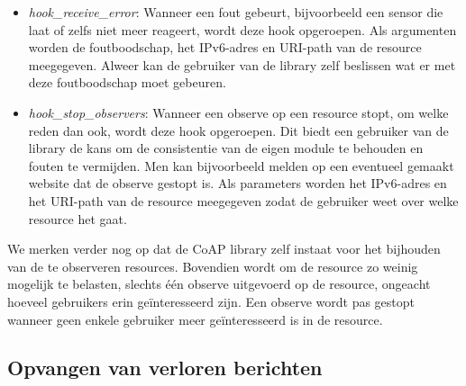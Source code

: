\begin{itemize}
\begin{itemize}
\item \textit{hook\_receive\_error}: Wanneer een fout gebeurt, bijvoorbeeld een sensor die laat of zelfs niet meer reageert, wordt deze hook opgeroepen. Als argumenten worden de foutboodschap, het IPv6-adres en URI-path van de resource meegegeven. Alweer kan de gebruiker van de library zelf beslissen wat er met deze foutboodschap moet gebeuren.
\item \textit{hook\_stop\_observers}: Wanneer een observe op een resource stopt, om welke reden dan ook, wordt deze hook opgeroepen. Dit biedt een gebruiker van de library de kans om de consistentie van de eigen module te behouden en fouten te vermijden. Men kan bijvoorbeeld melden op een eventueel gemaakt website dat de observe gestopt is. Als parameters worden het IPv6-adres en het URI-path van de resource meegegeven zodat de gebruiker weet over welke resource het gaat.
\end{itemize}
\end{itemize}

We merken verder nog op dat de CoAP library zelf instaat voor het bijhouden van de te observeren resources. Bovendien wordt om de resource zo weinig mogelijk te belasten, slechts \'{e}\'{e}n observe uitgevoerd op de resource, ongeacht hoeveel gebruikers erin ge\"{i}nteresseerd zijn. Een observe wordt pas gestopt wanneer geen enkele gebruiker meer ge\"{i}nteresseerd is in de resource.


\subsection{Opvangen van verloren berichten} \label{exponentialBackoff}


